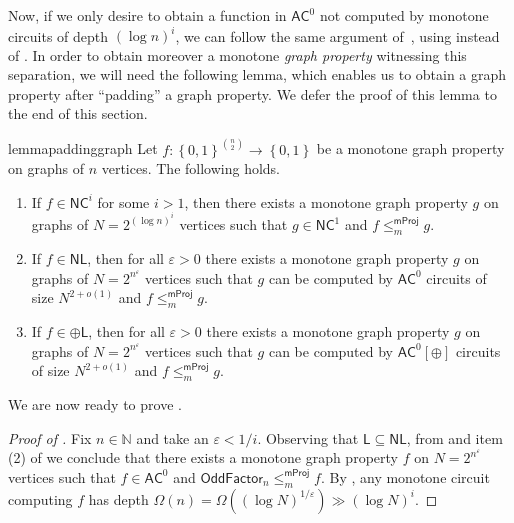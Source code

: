 \documentclass[10pt,a4paper]{article}
\newcommand{\eps}{\varepsilon}
\newcommand{\complexityfont}[1]{\mathsf{#1}}
\newcommand\NL           {\complexityfont{NL}}
\def\AC           {\complexityfont{AC}}
\def\pL           {\oplus\complexityfont{L}}
\def\NC           {\complexityfont{NC}}
\renewcommand{\L} {\complexityfont{L}}
\def\sseq{\subseteq}
\newcommand{\set}[1]{\left\{#1\right\}}
\newcommand{\blt}{\set{0,1}}
\newcommand{\xor}{\oplus}
\newcommand{\OddFactor}{\mathsf{OddFactor}}
\newcommand{\mprojred}{\leq^{\mathsf{mProj}}_m}
\def\bbn{{\mathbb N}}
\begin{document}
Now, if we only desire to obtain a function in $\AC^0$
not computed by monotone circuits of depth $(\log n)^i$,
we can follow the same argument of~,
using  instead of .
In order to obtain moreover a monotone \emph{graph property} witnessing
this separation, we will need the following lemma,
which enables us to obtain a graph property after ``padding'' a graph property.
We defer the proof of this lemma to
the end of this section.

\begin{restatable}{lemma}{paddinggraph}
    \label{lemma:padding_graph}
    Let $f : \blt^{\binom{n}{2}} \to \blt$
    be a monotone graph property on graphs of $n$ vertices.
    The following holds.
    \begin{enumerate}
        \item If $f \in \NC^i$ for some $i > 1$, then
            there exists a monotone graph property 
            $g$ on graphs of 
            $N = 2^{(\log n)^i}$ vertices
            such that 
            $g \in \NC^1$
            and 
            $f \mprojred g$.
        \item If $f \in \NL$, 
            then
            for all $\eps > 0$
            there exists
            a monotone graph property 
            $g$ on graphs of 
            $N = 2^{n^\eps}$ vertices
            such that 
            $g$ can be computed by  $\AC^0$ circuits of size $N^{2+o(1)}$
            and 
            $f \mprojred g$.
        \item If $f \in \pL$, 
            then
            for all $\eps > 0$
            there exists
            a monotone graph property 
            $g$ on graphs of 
            $N = 2^{n^\eps}$ vertices
            such that 
            $g$ can be computed by  $\AC^0[\xor]$ circuits of size $N^{2+o(1)}$
            and 
            $f \mprojred g$.
    \end{enumerate}
\end{restatable}

We are now ready to prove
.
\begin{proof}[Proof of ]
            Fix $n \in \bbn$ and take an $\eps < 1/i$.
            Observing that $\L \sseq \NL$,
            from
            and item (2) of 
            we conclude that
            there exists a monotone graph property $f$
            on 
            $N = 2^{n^\eps}$
            vertices
            such that 
            $f \in \AC^0$
            and $\OddFactor_n \mprojred f$.
            By ,
            any monotone circuit computing $f$
            has depth 
            $\Omega(n) = \Omega((\log N)^{1/\eps}) \gg (\log N)^i$.
\end{proof}
\end{document}
